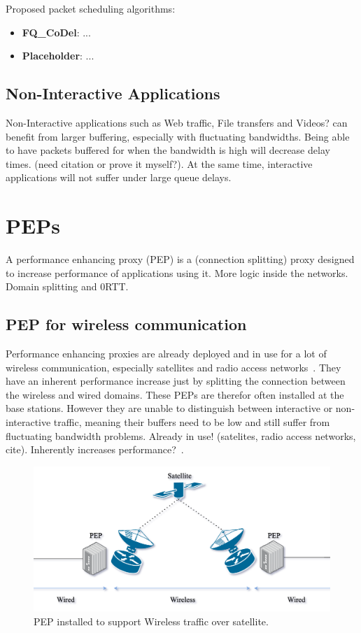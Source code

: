 \documentclass[a4paper,english, 11pt]{report}
\begin{document}
Proposed packet scheduling algorithms:
\begin{itemize}
  \item \textbf{FQ\_CoDel}: ...
  \item \textbf{Placeholder}: ...
\end{itemize}

\subsection{Non-Interactive Applications}
Non-Interactive applications such as Web traffic, File transfers and Videos? can benefit from larger buffering, especially with fluctuating bandwidths. Being able to have packets buffered for when the bandwidth is high will decrease delay times. (need citation or prove it myself?). At the same time, interactive applications will not suffer under large queue delays.

\section{PEPs}
A performance enhancing proxy (PEP) is a (connection splitting) proxy designed to increase performance of applications using it.
More logic inside the networks. Domain splitting and 0RTT.

\subsection{PEP for wireless communication}
Performance enhancing proxies are already deployed and in use for a lot of wireless communication, especially satellites and radio access networks~\cite{tcp_mmwave_proxy}. They have an inherent performance increase just by splitting the connection between the wireless and wired domains. These PEPs are therefor often installed at the base stations. However they are unable to distinguish between interactive or non-interactive traffic, meaning their buffers need to be low and still suffer from fluctuating bandwidth problems.
 Already in use! (satelites, radio access networks, cite). Inherently increases performance?~\cite{tcp_mmwave_proxy}.

\begin{figure}[h] %
	\centering
	\includegraphics[scale=0.50]{../diagrams/drawio/pep_satellite.png}
  	\caption{PEP installed to support Wireless traffic over satellite.}
  	\label{fig:blockage}
\end{figure}
\end{document}
